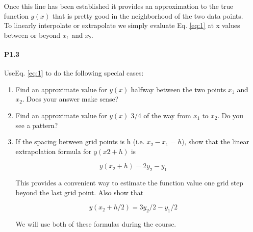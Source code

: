 \documentclass{book}
\theoremstyle{plain}
\theoremstyle{definition}
\numberwithin{exm}{chapter}
\theoremstyle{remark}
\theoremstyle{summary}
\theoremstyle{overview}
\begin{document}
    Once this line has been established it provides an approximation to the true function $y(x)$ that is pretty good in the neighborhood of the two data points. To linearly interpolate or extrapolate we simply evaluate Eq. \eqref{eq:1} at x values between or beyond $x_1$ and $x_2$.   
      
     \paragraph*{P1.3} UseEq. \eqref{eq:1} to do the following special cases:
     
     \begin{enumerate}[label=(\alph*)]
     
     	\item Find an approximate value for $y(x)$ halfway between the two points $x_1$ and $x_2$. Does your answer make sense?
     	
     	\item Find an approximate value for $y(x)$ 3/4 of the way from $x_1$ to $x_2$. Do you see a pattern?
     	
     
     	\item If the spacing between grid points is h (i.e. $x_2 − x_1 = h$), show that the linear extrapolation formula for $y(x2+h)$ is
     	
     	\begin{equation} \label{eq:2}
     		y(x_2 + h) = 2y_2 - y_1
     	\end{equation}
     	
     	This provides a convenient way to estimate the function value one grid step beyond the last grid point. Also show that
     	
     	\begin{equation} \label{eq:3}
     		y(x_2 + h/2) = 3y_2/2 - y_1/2
     	\end{equation}
     	
     	We will use both of these formulas during the course.
     	
     \end{enumerate}
\end{document}
